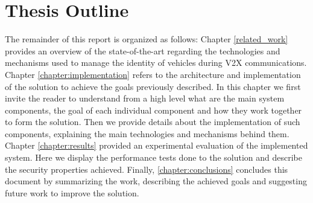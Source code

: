 \section{Thesis Outline}
\label{section:outline}

The remainder of this report is organized as follows: Chapter \ref{related_work} provides an overview of the state-of-the-art regarding the technologies and mechanisms used to manage the identity of vehicles during V2X communications. Chapter \ref{chapter:implementation} refers to the architecture and implementation of the solution to achieve the goals previously described. In this chapter we first invite the reader to understand from a high level what are the main system components, the goal of each individual component and how they work together to form the solution. Then we provide details about the implementation of such components, explaining the main technologies and mechanisms behind them. Chapter \ref{chapter:results} provided an experimental evaluation of the implemented system. Here we display the performance tests done to the solution and describe the security properties achieved. Finally, \ref{chapter:conclusions} concludes this document by summarizing the work, describing the achieved goals and suggesting future work to improve the solution.


